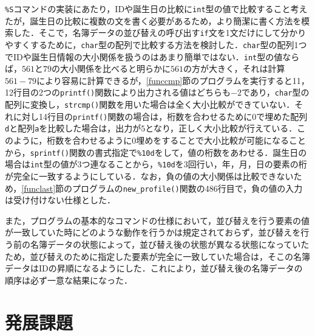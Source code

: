 \verb|%S|コマンドの実装にあたり，IDや誕生日の比較に\verb|int|型の値で比較すること考えたが，誕生日の比較に複数の文を書く必要があるため，より簡潔に書く方法を模索した．そこで，名簿データの並び替えの呼び出す\verb|if|文を1文だけにして分かりやすくするために，\verb|char|型の配列で比較する方法を検討した．\verb|char|型の配列1つでIDや誕生日情報の大小関係を扱うのはあまり簡単ではない．\verb|int|型の値ならば，$561$と$79$の大小関係を比べると明らかに$561$の方が大きく，それは計算$561 - 79$により容易に計算できるが，\ref{funccmp}節のプログラムを実行すると11，12行目の2つの\verb|printf()|関数により出力される値はどちらも$-2$であり，\verb|char|型の配列に変換し，\verb|strcmp()|関数を用いた場合は全く大小比較ができていない．それに対し14行目の\verb|printf()|関数の場合は，桁数を合わせるために0で埋めた配列\verb|d|と配列\verb|a|を比較した場合は，出力が$5$となり，正しく大小比較が行えている．このように，桁数を合わせるように0埋めをすることで大小比較が可能になることから，\verb|sprintf()|関数の書式指定で\verb|%10d|をして，値の桁数をあわせる．誕生日の場合は\verb|int|型の値が3つ連なることから，\verb|%10d|を3回行い，年，月，日の要素の桁が完全に一致するようにしている．なお，負の値の大小関係は比較できないため，\ref{funclast}節のプログラムの\verb|new_profile()|関数の486行目で，負の値の入力は受け付けない仕様とした．

また，プログラムの基本的なコマンドの仕様において，並び替えを行う要素の値が一致していた時にどのような動作を行うかは規定されておらず，並び替えを行う前の名簿データの状態によって，並び替え後の状態が異なる状態になっていたため，並び替えのために指定した要素が完全に一致していた場合は，そこの名簿データはIDの昇順になるようにした．これにより，並び替え後の名簿データの順序は必ず一意な結果になった．

\section{発展課題} \label{advancedfunction}

